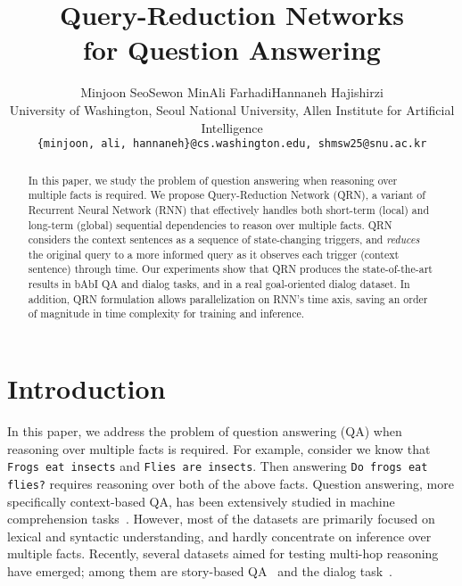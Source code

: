\documentclass[table]{article}
\title{Query-Reduction Networks\\
for Question Answering}
\author{
  Minjoon Seo\qquad Sewon Min\qquad Ali Farhadi\qquad Hannaneh Hajishirzi \\
  University of Washington, Seoul National University, Allen Institute for Artificial Intelligence \\
  \texttt{\{minjoon, ali, hannaneh\}@cs.washington.edu, shmsw25@snu.ac.kr}
}
\begin{document}
\maketitle

\begin{abstract}





In this paper, we study the problem of question answering when reasoning over multiple facts is required. 
We propose Query-Reduction Network (QRN), a variant of Recurrent Neural Network (RNN) that effectively handles both short-term (local) and long-term (global) sequential dependencies to reason over multiple facts. 
QRN considers the context sentences as a sequence of state-changing triggers, and \emph{reduces} the
original query to a more informed query as it observes each trigger (context sentence) through time. 
Our experiments show that QRN produces the state-of-the-art results in  bAbI QA and dialog tasks, and in a real goal-oriented dialog dataset. In addition, QRN formulation allows parallelization on RNN's time axis, saving an order of magnitude in time complexity for training and inference.  

\end{abstract}

\section{Introduction}\label{sec:intro}


In this paper, we address the problem of  question answering (QA) when reasoning over multiple facts is required. 
For example, consider we know that \texttt{Frogs eat insects} and \texttt{Flies are insects}. 
Then answering \texttt{Do frogs eat flies?} requires reasoning over both of the above facts. Question answering, more specifically context-based QA, has been extensively studied in machine comprehension tasks~\citep{MCTest,hermann2015teaching,hill2015goldilocks,squad}. However, most of the datasets are primarily focused on lexical and syntactic understanding, and hardly concentrate on inference over multiple facts. 
Recently, several datasets aimed for testing multi-hop reasoning have emerged; among them are story-based QA~\citep{babi} and the dialog task~\citep{bordes2016learning}.
\end{document}
